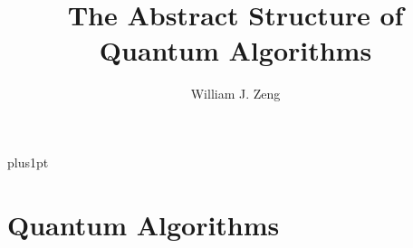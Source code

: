 \documentclass[12pt]{ociamthesis}  %
\title{The Abstract Structure of \\[1ex] Quantum Algorithms}
\author{William J. Zeng} %
\begin{document}
\baselineskip=18pt plus1pt

\setcounter{secnumdepth}{3}
\setcounter{tocdepth}{3}

\maketitle                  %

\begin{romanpages}          %
\tableofcontents            %
\listoffigures              %
\end{romanpages}            %





\chapter{Quantum Algorithms}
\todo{\chapabstract{}}








%

\renewcommand{\bibname}{References}
\end{document}
